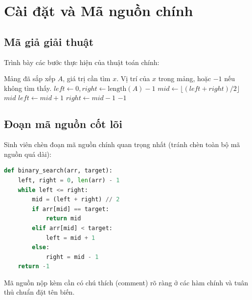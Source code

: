\section{Cài đặt và Mã nguồn chính}

\subsection{Mã giả giải thuật}
Trình bày các bước thực hiện của thuật toán chính:

\begin{algorithm}[h!]
    \caption{Thuật toán tìm kiếm phần tử}
    \label{alg:binary_search}
    \begin{algorithmic}[1]
        \Require Mảng đã sắp xếp $A$, giá trị cần tìm $x$.
        \Ensure Vị trí của $x$ trong mảng, hoặc $-1$ nếu không tìm thấy.
        \State $left \leftarrow 0, right \leftarrow \text{length}(A) - 1$
            \State $mid \leftarrow \lfloor (left + right) / 2 \rfloor$
                \State \Return $mid$
                \State $left \leftarrow mid + 1$
            \Else
                \State $right \leftarrow mid - 1$
            \EndIf
        \EndWhile
        \State \Return $-1$
    \end{algorithmic}
\end{algorithm}

\subsection{Đoạn mã nguồn cốt lõi}
Sinh viên chèn đoạn mã nguồn chính quan trọng nhất (tránh chèn toàn bộ mã nguồn quá dài):

\begin{lstlisting}[language=Python, caption={Hàm tìm kiếm nhị phân bằng Python}]
def binary_search(arr, target):
    left, right = 0, len(arr) - 1
    while left <= right:
        mid = (left + right) // 2
        if arr[mid] == target:
            return mid
        elif arr[mid] < target:
            left = mid + 1
        else:
            right = mid - 1
    return -1
\end{lstlisting}

\begin{callouttip}
    Mã nguồn nộp kèm cần có chú thích (comment) rõ ràng ở các hàm chính và tuân thủ chuẩn đặt tên biến.
\end{callouttip}
